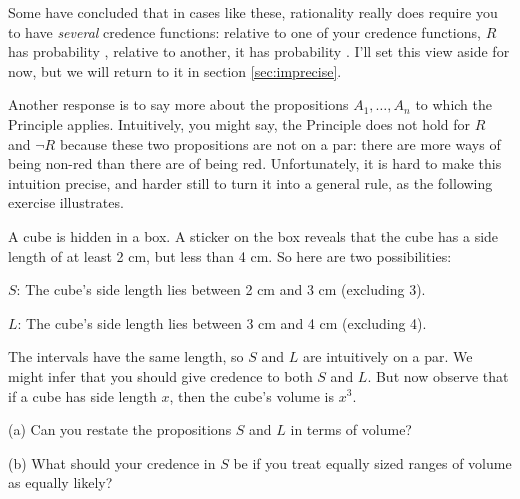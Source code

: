 Some have concluded that in cases like these, rationality really does
require you to have \emph{several} credence functions: relative to one
of your credence functions, $R$ has probability ,
relative to another, it has probability . I'll set
this view aside for now, but we will return to it in section
\ref{sec:imprecise}.

Another response is to say more about the propositions
$A_1,\ldots,A_n$ to which the Principle applies. Intuitively, you
might say, the Principle does not hold for $R$ and $\neg R$ because
these two propositions are not on a par: there are more ways of being
non-red than there are of being red. Unfortunately, it is hard to make this
intuition precise, and harder still to turn it into a general rule, as
the following exercise illustrates.

\begin{exercise}{2}\label{e:cubefactory}
  A cube is hidden in a box. A sticker on the box reveals that the cube
  has a side length of at least 2 cm, but less than 4 cm. So here are
  two possibilities:
  \begin{enumerate*}
  \item[$S$:] The cube's side length lies between 2 cm and 3 cm (excluding 3).
  \item[$L$:] The cube's side length lies between 3 cm and 4 cm (excluding 4).
  \end{enumerate*}
  The intervals have the same length, so $S$ and $L$ are intuitively
  on a par. We might infer that you should give credence
   to both $S$ and $L$. But now observe that if a cube
  has side length $x$, then the cube's volume is $x^3$.
  \begin{enumerate*}
  \item[(a)] Can you restate the propositions $S$ and $L$ in terms of
    volume?
  \item[(b)] What should your credence in $S$ be if you treat equally
    sized ranges of volume as equally likely?
  \end{enumerate*}
  \vspace{-5mm}
\end{exercise}

